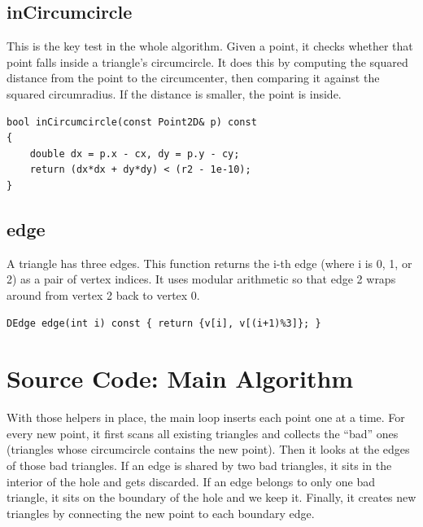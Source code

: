 \documentclass[12pt]{extreport}
\begin{document}
\subsection{inCircumcircle}
This is the key test in the whole algorithm. Given a point, it checks whether that point falls inside a triangle's circumcircle. It does this by computing the squared distance from the point to the circumcenter, then comparing it against the squared circumradius. If the distance is smaller, the point is inside.

\begin{lstlisting}[style=cppstyle]
bool inCircumcircle(const Point2D& p) const
{
    double dx = p.x - cx, dy = p.y - cy;
    return (dx*dx + dy*dy) < (r2 - 1e-10);
}
\end{lstlisting}

\subsection{edge}
A triangle has three edges. This function returns the i-th edge (where i is 0, 1, or 2) as a pair of vertex indices. It uses modular arithmetic so that edge 2 wraps around from vertex 2 back to vertex 0.

\begin{lstlisting}[style=cppstyle]
DEdge edge(int i) const { return {v[i], v[(i+1)%3]}; }
\end{lstlisting}

\section{Source Code: Main Algorithm}

With those helpers in place, the main loop inserts each point one at a time. For every new point, it first scans all existing triangles and collects the ``bad'' ones (triangles whose circumcircle contains the new point). Then it looks at the edges of those bad triangles. If an edge is shared by two bad triangles, it sits in the interior of the hole and gets discarded. If an edge belongs to only one bad triangle, it sits on the boundary of the hole and we keep it. Finally, it creates new triangles by connecting the new point to each boundary edge.
\end{document}

